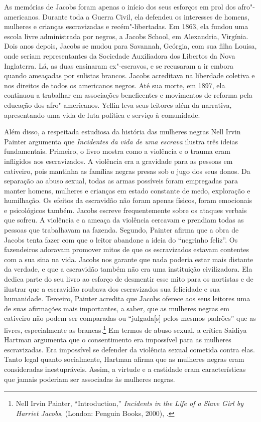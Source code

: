 As memórias de Jacobs foram apenas o início dos seus esforços em prol
dos afro"-americanos. Durante toda a Guerra Civil, ela defendeu os
interesses de homens, mulheres e crianças escravizadas e
recém"-libertadas. Em 1863, ela fundou uma escola livre administrada por
negros, a Jacobs School, em Alexandria, Virgínia. Dois anos depois,
Jacobs se mudou para Savannah, Geórgia, com sua filha Louisa, onde
seriam representantes da Sociedade Auxiliadora dos Libertos da Nova
Inglaterra. Lá, as duas ensinaram ex"-escravos, e se recusaram a ir
embora quando ameaçadas por sulistas brancos. Jacobs acreditava na
liberdade coletiva e nos direitos de todos os americanos negros. Até sua
morte, em 1897, ela continuou a trabalhar em associações beneficentes e
movimentos de reforma pela educação dos afro"-americanos. Yellin leva
seus leitores além da narrativa, apresentando uma vida de luta política e
serviço à comunidade.

Além disso, a respeitada estudiosa da história das mulheres negras Nell
Irvin Painter argumenta que \emph{Incidentes da vida de uma escrava}
ilustra três ideias fundamentais. Primeiro, o livro mostra como a
violência e o trauma eram infligidos aos escravizados. A violência era a
gravidade para as pessoas em cativeiro, pois
mantinha as famílias negras presas sob o jugo dos seus donos. Da
separação ao abuso sexual, todas as armas possíveis foram empregadas
para manter homens, mulheres e crianças em estado constante de medo,
exploração e humilhação. Os efeitos da escravidão não foram apenas
físicos, foram emocionais e psicológicos também. Jacobs escreve
frequentemente sobre os ataques verbais que sofreu. A violência e a
ameaça da violência cercavam e prendiam todas as pessoas que trabalhavam
na fazenda. Segundo, Painter afirma que a obra de Jacobs tenta fazer com
que o leitor abandone a ideia do ``negrinho feliz''. Os fazendeiros
adoravam promover mitos de que os escravizados estavam contentes com a
sua sina na vida. Jacobs nos garante que nada poderia estar mais
distante da verdade, e que a escravidão também não era uma instituição
civilizadora. Ela dedica parte do seu livro ao esforço de desmentir esse
mito para os nortistas e de ilustrar que a escravidão roubava dos
escravizados sua felicidade e sua humanidade. Terceiro, Painter acredita
que Jacobs oferece aos seus leitores uma de suas afirmações mais
importantes, a saber, que as mulheres negras em cativeiro não podem ser
comparadas ou ``julgada{[}s{]} pelos mesmos padrões'' que as livres,
especialmente as brancas.\footnote{Nell Irvin Painter, ``Introduction,''
  \emph{Incidents in the Life of a Slave Girl by Harriet Jacobs},
  (London: Penguin Books, 2000), .} Em termos de abuso sexual, a
crítica Saidiya Hartman argumenta que o consentimento era impossível
para as mulheres escravizadas. Era impossível se defender da violência
sexual cometida contra elas. Tanto legal quanto socialmente, Hartman
afirma que as mulheres negras eram consideradas inestupráveis. Assim, a
virtude e a castidade eram características que jamais poderiam ser
associadas às mulheres negras.

